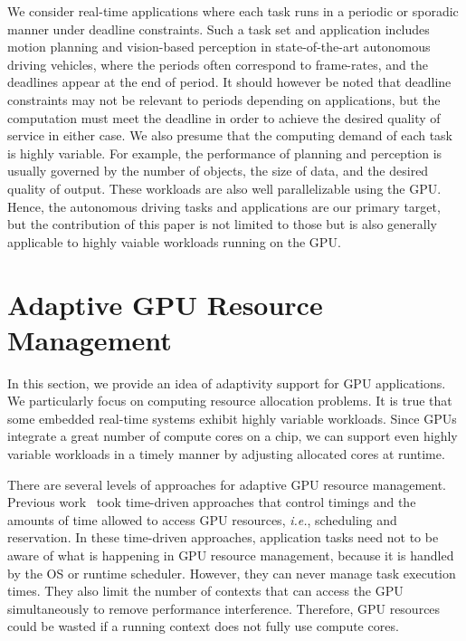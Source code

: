 \documentclass[times, 10pt, twocolumn]{article}
\begin{document}
We consider real-time applications where each task runs in a periodic or
sporadic manner under deadline constraints.
Such a task set and application includes motion planning and 
vision-based perception in state-of-the-art autonomous driving
vehicles, where the periods often correspond to frame-rates, and the
deadlines appear at the end of period.
It should however be noted that deadline constraints may not be relevant
to periods depending on applications, but the computation must meet the
deadline in order to achieve the desired quality of service in either case.
We also presume that the computing demand of each task is highly
variable.
For example, the performance of planning and perception is usually
governed by the number of objects, the size of data, and the desired
quality of output.
These workloads are also well parallelizable using the GPU.
Hence, the autonomous driving tasks and applications are our primary
target, but the contribution of this paper is not limited to those but
is also generally applicable to highly vaiable workloads running on the
GPU.

\section{Adaptive GPU Resource Management}
\label{sec:adaptivity_support}

In this section, we provide an idea of adaptivity support for GPU
applications.
We particularly focus on computing resource allocation problems.
It is true that some embedded real-time systems exhibit highly variable
workloads.
Since GPUs integrate a great number of compute cores on a chip, we can
support even highly variable workloads in a timely manner by adjusting
allocated cores at runtime.

There are several levels of approaches for adaptive GPU resource
management.
Previous work~\cite{Kato_RTAS11, Kato_RTSS11, Kato_ATC11} took
time-driven approaches that control timings and the amounts of time
allowed to access GPU resources, \textit{i.e.}, scheduling and
reservation.
In these time-driven approaches, application tasks need not to be aware
of what is happening in GPU resource management, because it is handled
by the OS or runtime scheduler.
However, they can never manage task execution times.
They also limit the number of contexts that can access the GPU
simultaneously to remove performance interference.
Therefore, GPU resources could be wasted if a running context does not
fully use compute cores.
\end{document}
